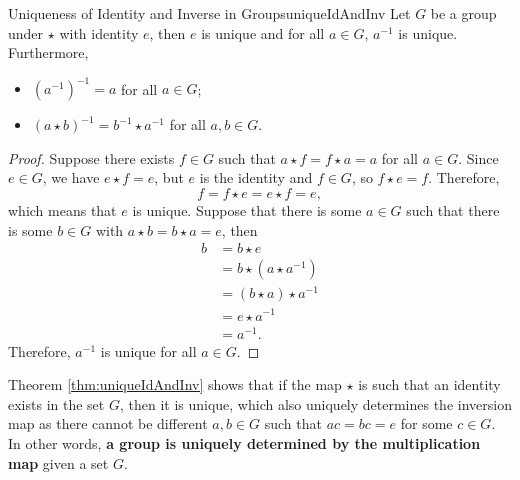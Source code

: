 \documentclass[math]{amznotes}
\theoremstyle{remark}
\newcommand{\0}{\mathbf{0}}
\newcommand{\1}{\mathbf{1}}
\begin{document}
\begin{thmbox}{Uniqueness of Identity and Inverse in Groups}{uniqueIdAndInv}
    Let $G$ be a group under $\star$ with identity $e$, then $e$ is unique and for all $a \in G$, $a^{-1}$ is unique. Furthermore, 
    \begin{itemize}
        \item $\left(a^{-1}\right)^{-1} = a$ for all $a \in G$;
        \item $\left(a \star b\right)^{-1} = b^{-1} \star a^{-1}$ for all $a, b \in G$.
    \end{itemize}
    \tcblower
    \begin{proof}
        Suppose there exists $f \in G$ such that $a \star f = f \star a = a$ for all $a \in G$. Since $e \in G$, we have $e \star f = e$, but $e$ is the identity and $f \in G$, so $f \star e = f$. Therefore,
        \begin{equation*}
            f = f \star e = e \star f = e,
        \end{equation*}
        which means that $e$ is unique. Suppose that there is some $a \in G$ such that there is some $b \in G$ with $a \star b = b \star a = e$, then
        \begin{align*}
            b & = b \star e \\
            & = b \star \left(a \star a^{-1}\right) \\
            & = \left(b \star a\right) \star a^{-1} \\
            & = e \star a^{-1} \\
            & = a^{-1}.
        \end{align*}
        Therefore, $a^{-1}$ is unique for all $a \in G$.
    \end{proof}
\end{thmbox}
Theorem \ref{thm:uniqueIdAndInv} shows that if the map $\star$ is such that an identity exists in the set $G$, then it is unique, which also uniquely determines the inversion map as there cannot be different $a, b \in G$ such that $ac = bc = e$ for some $c \in G$. In other words, \textbf{a group is uniquely determined by the multiplication map} given a set $G$.
\end{document}
